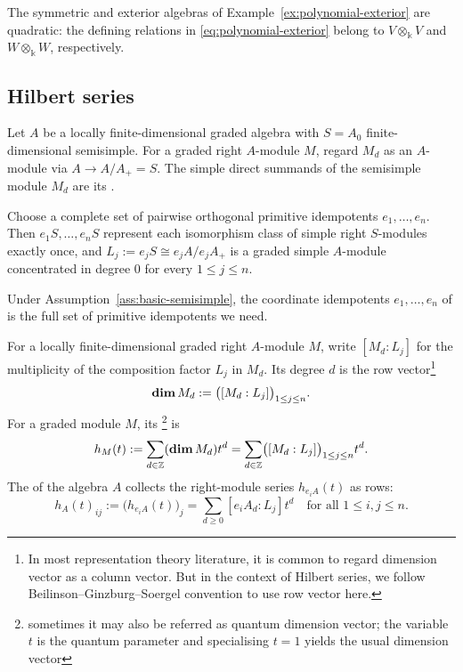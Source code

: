 \begin{example}
The symmetric and exterior algebras of Example~\ref{ex:polynomial-exterior} are quadratic: the defining relations in \eqref{eq:polynomial-exterior} belong to $V\otimes_\Bbbk V$ and $W\otimes_\Bbbk W$, respectively.
\end{example}

\subsection{Hilbert series}

Let $A$ be a locally finite-dimensional graded algebra with $S=A_0$ finite-dimensional semisimple.
For a graded right $A$-module $M$, regard $M_d$ as an $A$-module via $A\to A/A_+=S$.
The simple direct summands of the semisimple module $M_d$ are its .

\begin{notation}
Choose a complete set of pairwise orthogonal primitive idempotents $e_1,\ldots,e_n$.
Then $e_1S,\ldots,e_nS$ represent each isomorphism class of simple right $S$-modules exactly once, and $L_j:=e_jS\cong e_jA/e_jA_+$ is a graded simple $A$-module concentrated in degree $0$ for every $1\leq j\leq n$.
\label{not:hilbert-simples-summands}
\end{notation}

\begin{remark}
Under Assumption~\ref{ass:basic-semisimple}, the coordinate idempotents $e_1,\ldots,e_n$ of is the full set of primitive idempotents we need.
\end{remark}

\begin{definition}\label{def:dimension-vector}\label{def:hilbert-series}
For a locally finite-dimensional graded right $A$-module $M$, write $[M_d:L_j]$ for the multiplicity of the composition factor $L_j$ in $M_d$.
Its degree $d$  is the row vector\footnote{In most representation theory literature, it is common to regard dimension vector as a column vector.  But in the context of Hilbert series, we follow Beilinson--Ginzburg--Soergel convention to use row vector here.}
\[
\operatorname{\mathbf{dim}} M_d:=\bigl([M_d:L_j]\bigr)_{1\leq j\leq n}.
\]
For a graded module $M$, its \footnote{sometimes it may also be referred as quantum dimension vector; the variable $t$ is the quantum parameter and specialising $t=1$ yields the usual dimension vector} is
\[
h_M(t):=\sum_{d\in\mathbb{Z}}(\operatorname{\mathbf{dim}} M_d)t^d
=\sum_{d\in\mathbb{Z}}\bigl([M_d:L_j]\bigr)_{1\leq j\leq n}t^d.
\]
The  of the algebra $A$ collects the right-module series $h_{e_iA}(t)$ as rows:
\[
h_A(t)_{ij}:=\bigl(h_{e_iA}(t)\bigr)_j
=\sum_{d\geq0}[e_iA_d:L_j]t^d
\quad\text{for all }1\leq i,j\leq n.
\]
\end{definition}

